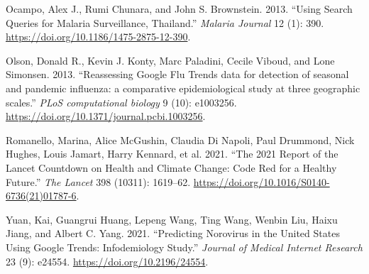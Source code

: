 \documentclass[
  12pt,
]{article}
\newlength{\cslhangindent}
\newenvironment{CSLReferences}[2] %
 {\begin{list}{}{%
  \setlength{\itemindent}{0pt}
  \setlength{\leftmargin}{0pt}
  \setlength{\parsep}{0pt}
  \ifodd #1
   \setlength{\leftmargin}{\cslhangindent}
   \setlength{\itemindent}{-1\cslhangindent}
  \fi
  \setlength{\itemsep}{#2\baselineskip}}}
 {\end{list}}
\begin{document}
\begin{CSLReferences}{1}{0}
Ocampo, Alex J., Rumi Chunara, and John S. Brownstein. 2013. {``Using
Search Queries for Malaria Surveillance, Thailand.''} \emph{Malaria
Journal} 12 (1): 390. \url{https://doi.org/10.1186/1475-2875-12-390}.

Olson, Donald R., Kevin J. Konty, Marc Paladini, Cecile Viboud, and Lone
Simonsen. 2013. {``Reassessing Google Flu Trends data for detection of
seasonal and pandemic influenza: a comparative epidemiological study at
three geographic scales.''} \emph{PLoS computational biology} 9 (10):
e1003256. \url{https://doi.org/10.1371/journal.pcbi.1003256}.

Romanello, Marina, Alice McGushin, Claudia Di Napoli, Paul Drummond,
Nick Hughes, Louis Jamart, Harry Kennard, et al. 2021. {``The 2021
Report of the Lancet Countdown on Health and Climate Change: Code Red
for a Healthy Future.''} \emph{The Lancet} 398 (10311): 1619--62.
\url{https://doi.org/10.1016/S0140-6736(21)01787-6}.

Yuan, Kai, Guangrui Huang, Lepeng Wang, Ting Wang, Wenbin Liu, Haixu
Jiang, and Albert C. Yang. 2021. {``Predicting Norovirus in the United
States Using Google Trends: Infodemiology Study.''} \emph{Journal of
Medical Internet Research} 23 (9): e24554.
\url{https://doi.org/10.2196/24554}.

\end{CSLReferences}
\end{document}
